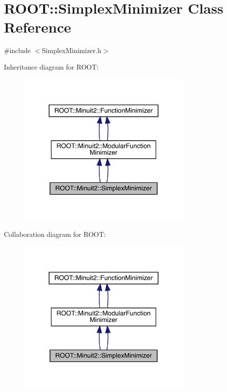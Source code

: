\hypertarget{classROOT_1_1Minuit2_1_1SimplexMinimizer}{}\section{R\+O\+OT\+:\+:Simplex\+Minimizer Class Reference}
\label{classROOT_1_1Minuit2_1_1SimplexMinimizer}


{\ttfamily \#include $<$Simplex\+Minimizer.\+h$>$}



Inheritance diagram for R\+O\+OT\+:\nopagebreak
\begin{figure}[H]
\begin{center}
\leavevmode
\includegraphics[width=248pt]{d4/d74/classROOT_1_1Minuit2_1_1SimplexMinimizer__inherit__graph}
\end{center}
\end{figure}


Collaboration diagram for R\+O\+OT\+:\nopagebreak
\begin{figure}[H]
\begin{center}
\leavevmode
\includegraphics[width=248pt]{d7/d74/classROOT_1_1Minuit2_1_1SimplexMinimizer__coll__graph}
\end{center}
\end{figure}
